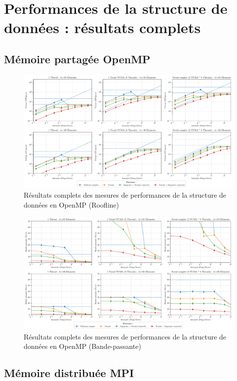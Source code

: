 \section{Performances de la structure de données : résultats complets}

\subsection{Mémoire partagée OpenMP}

\begin{figure}
    \includegraphics[width=\textwidth]{img/bench_mesh_roofline_full.pdf}
    \caption{Résultats complets des mesures de performances de la structure de données en OpenMP (Roofline)}
\end{figure}

\begin{figure}
    \includegraphics[width=\textwidth]{img/bench_mesh_bandwidth_full.pdf}
    \caption{Résultats complets des mesures de performances de la structure de données en OpenMP (Bande-passante)}
\end{figure}

\subsection{Mémoire distribuée MPI}